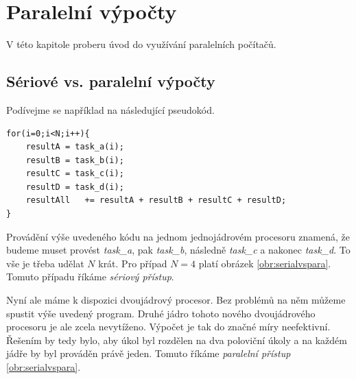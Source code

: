 \chapter{Paralelní výpočty}

V této kapitole proberu úvod do využívání paralelních počítačů.

\section{Sériové vs. paralelní výpočty}

Podívejme se například na následující pseudokód.

\begin{Verbatim}
for(i=0;i<N;i++){
  	resultA	= task_a(i);
   	resultB	= task_b(i);
   	resultC	= task_c(i);
   	resultD	= task_d(i);
   	resultAll	+= resultA + resultB + resultC + resultD;
}    
\end{Verbatim}

Provádění výše uvedeného kódu na jednom jednojádrovém procesoru znamená, že budeme muset
provést \emph{task\_a}, pak \emph{task\_b}, následně \emph{task\_c} a nakonec \emph{task\_d}.
To vše je třeba udělat $N$ krát. Pro případ $N=4$ platí obrázek \ref{obr:serialvspara}. Tomuto případu říkáme \emph{sériový přístup}.

Nyní ale máme k dispozici dvoujádrový procesor. Bez problémů na něm můžeme spustit výše uvedený program. Druhé jádro tohoto nového dvoujádrového procesoru je ale zcela nevytíženo. Výpočet je tak do značné míry neefektivní. Řešením by tedy bylo, aby úkol byl rozdělen na dva poloviční úkoly a na každém jádře by byl prováděn právě jeden. Tomuto říkáme \emph{paralelní přístup} \ref{obr:serialvspara}.

